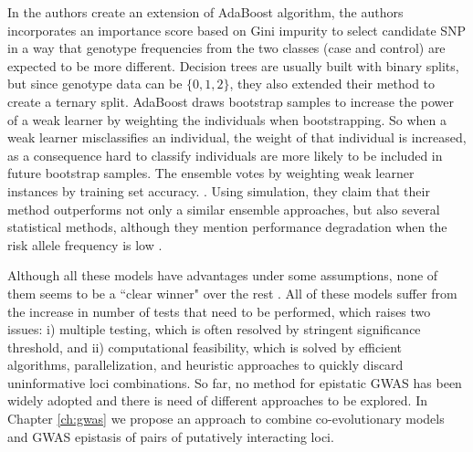 \begin{enumerate}
In \cite{li2011detecting} the authors create an extension of AdaBoost algorithm, the authors incorporates an importance score based on Gini impurity to select candidate SNP  in a way that genotype frequencies from the two classes (case and control) are expected to be more different.
Decision trees are usually built with binary splits, but since genotype data can be $\{0, 1, 2\}$, they also extended their method to create a ternary split.
AdaBoost draws bootstrap samples to increase the power of a weak learner by weighting the individuals when bootstrapping. 
So when a weak learner misclassifies an individual, the weight of that individual is increased, as a consequence hard to classify individuals are more likely to be included in future bootstrap samples. 
The ensemble votes by weighting weak learner instances by training set accuracy.  \cite{li2011detecting}.
Using simulation, they claim that their method outperforms not only a similar ensemble approaches, but also several statistical methods, although they mention performance degradation when the risk allele frequency is low \cite{li2011detecting}.

\end{enumerate}

Although all these models have advantages under some assumptions, none of them seems to be a ``clear winner" over the rest \cite{cordell2009detecting}. 
All of these models suffer from the increase in number of tests that need to be performed, which raises two issues: i) multiple testing, which is often resolved by stringent significance threshold, and ii) computational feasibility, which is solved by efficient algorithms, parallelization, and heuristic approaches to quickly discard uninformative loci combinations. 
So far, no method for epistatic GWAS has been widely adopted and there is need of different approaches to be explored. In Chapter \ref{ch:gwas} we propose an approach to combine co-evolutionary models and GWAS epistasis of pairs of putatively interacting loci.



